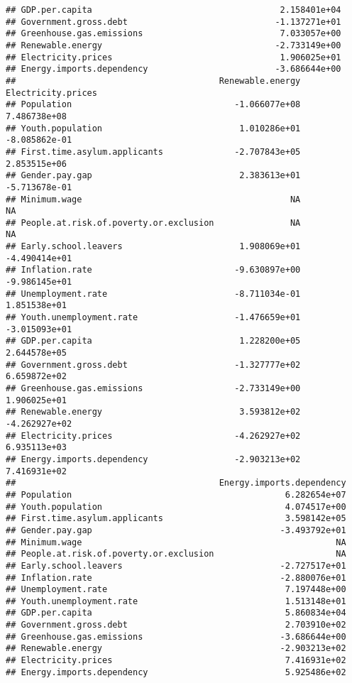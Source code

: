 \documentclass[
]{article}
\begin{document}
\begin{verbatim}
## GDP.per.capita                                     2.158401e+04
## Government.gross.debt                             -1.137271e+01
## Greenhouse.gas.emissions                           7.033057e+00
## Renewable.energy                                  -2.733149e+00
## Electricity.prices                                 1.906025e+01
## Energy.imports.dependency                         -3.686644e+00
##                                        Renewable.energy Electricity.prices
## Population                                -1.066077e+08       7.486738e+08
## Youth.population                           1.010286e+01      -8.085862e-01
## First.time.asylum.applicants              -2.707843e+05       2.853515e+06
## Gender.pay.gap                             2.383613e+01      -5.713678e-01
## Minimum.wage                                         NA                 NA
## People.at.risk.of.poverty.or.exclusion               NA                 NA
## Early.school.leavers                       1.908069e+01      -4.490414e+01
## Inflation.rate                            -9.630897e+00      -9.986145e+01
## Unemployment.rate                         -8.711034e-01       1.851538e+01
## Youth.unemployment.rate                   -1.476659e+01      -3.015093e+01
## GDP.per.capita                             1.228200e+05       2.644578e+05
## Government.gross.debt                     -1.327777e+02       6.659872e+02
## Greenhouse.gas.emissions                  -2.733149e+00       1.906025e+01
## Renewable.energy                           3.593812e+02      -4.262927e+02
## Electricity.prices                        -4.262927e+02       6.935113e+03
## Energy.imports.dependency                 -2.903213e+02       7.416931e+02
##                                        Energy.imports.dependency
## Population                                          6.282654e+07
## Youth.population                                    4.074517e+00
## First.time.asylum.applicants                        3.598142e+05
## Gender.pay.gap                                     -3.493792e+01
## Minimum.wage                                                  NA
## People.at.risk.of.poverty.or.exclusion                        NA
## Early.school.leavers                               -2.727517e+01
## Inflation.rate                                     -2.880076e+01
## Unemployment.rate                                   7.197448e+00
## Youth.unemployment.rate                             1.513148e+01
## GDP.per.capita                                      5.860834e+04
## Government.gross.debt                               2.703910e+02
## Greenhouse.gas.emissions                           -3.686644e+00
## Renewable.energy                                   -2.903213e+02
## Electricity.prices                                  7.416931e+02
## Energy.imports.dependency                           5.925486e+02
\end{verbatim}
\end{document}
